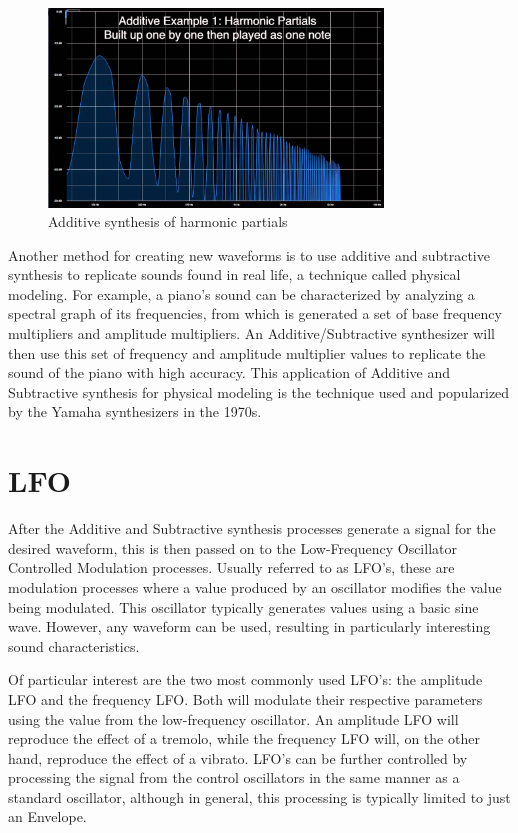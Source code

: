 \documentclass[a4paper,12pt]{report}
\begin{document}
\begin{figure}[h]
    \centering
    \includegraphics[width=24em]{AdditiveSynthesisbyHarmonics.jpg}
    \caption{Additive synthesis of harmonic partials}
    \label{fig:AdditiveSynthesisbyHarmonics}
\end{figure}

Another method for creating new waveforms is to use additive and subtractive synthesis to replicate sounds found in real life, a technique called physical modeling. For example, a piano's sound can be characterized by analyzing a spectral graph of its frequencies, from which is generated a set of base frequency multipliers and amplitude multipliers. An Additive/Subtractive synthesizer will then use this set of frequency and amplitude multiplier values to replicate the sound of the piano with high accuracy. This application of Additive and Subtractive synthesis for physical modeling is the technique used and popularized by the Yamaha synthesizers in the 1970s.

\section{LFO}
\label{sec:lfo}
After the Additive and Subtractive synthesis processes generate a signal for the desired waveform, this is then passed on to the Low-Frequency Oscillator Controlled Modulation processes. Usually referred to as LFO's, these are modulation processes where a value produced by an oscillator modifies the value being modulated. This oscillator typically generates values using a basic sine wave. However, any waveform can be used, resulting in particularly interesting sound characteristics.

Of particular interest are the two most commonly used LFO's: the amplitude LFO and the frequency LFO. Both will modulate their respective parameters using the value from the low-frequency oscillator. An amplitude LFO will reproduce the effect of a tremolo, while the frequency LFO will, on the other hand, reproduce the effect of a vibrato. LFO's can be further controlled by processing the signal from the control oscillators in the same manner as a standard oscillator, although in general, this processing is typically limited to just an Envelope.
\end{document}
